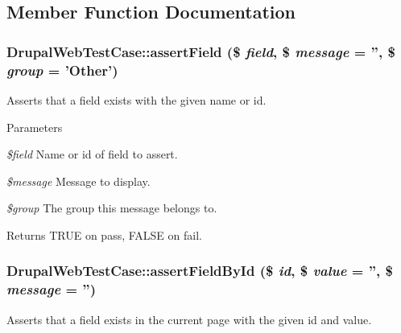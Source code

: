 \subsection{Member Function Documentation}
\hypertarget{classDrupalWebTestCase_a3955b3b90e4688bbd6f8fa0c5b47bfbe}{
\subsubsection[{assertField}]{\setlength{\rightskip}{0pt plus 5cm}DrupalWebTestCase::assertField (\$ {\em field}, \/  \$ {\em message} = {\ttfamily ''}, \/  \$ {\em group} = {\ttfamily 'Other'})}}
\label{classDrupalWebTestCase_a3955b3b90e4688bbd6f8fa0c5b47bfbe}
Asserts that a field exists with the given name or id.


\begin{DoxyParams}{Parameters}
\item[{\em \$field}]Name or id of field to assert. \item[{\em \$message}]Message to display. \item[{\em \$group}]The group this message belongs to. \end{DoxyParams}
\begin{DoxyReturn}{Returns}
TRUE on pass, FALSE on fail. 
\end{DoxyReturn}
\hypertarget{classDrupalWebTestCase_ad3779958ca911e96582177f110278111}{
\subsubsection[{assertFieldById}]{\setlength{\rightskip}{0pt plus 5cm}DrupalWebTestCase::assertFieldById (\$ {\em id}, \/  \$ {\em value} = {\ttfamily ''}, \/  \$ {\em message} = {\ttfamily ''})}}
\label{classDrupalWebTestCase_ad3779958ca911e96582177f110278111}
Asserts that a field exists in the current page with the given id and value.


